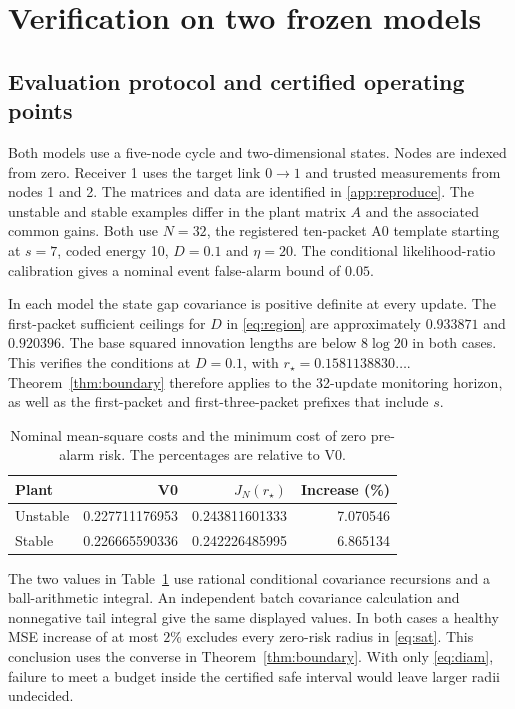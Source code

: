 \section{Verification on two frozen models}
\label{sec:evidence}

\subsection{Evaluation protocol and certified operating points}

Both models use a five-node cycle and two-dimensional states. Nodes are indexed from zero. Receiver 1 uses the target link \(0\to1\) and trusted measurements from nodes 1 and 2. The matrices and data are identified in \ref{app:reproduce}. The unstable and stable examples differ in the plant matrix \(A\) and the associated common gains. Both use \(N=32\), the registered ten-packet A0 template starting at \(s=7\), coded energy 10, \(D=0.1\) and \(\eta=20\). The conditional likelihood-ratio calibration gives a nominal event false-alarm bound of \(0.05\).

In each model the state gap covariance is positive definite at every update. The first-packet sufficient ceilings for \(D\) in \eqref{eq:region} are approximately \(0.933871\) and \(0.920396\). The base squared innovation lengths are below \(8\log 20\) in both cases. This verifies the conditions at \(D=0.1\), with \(r_\star=0.1581138830\ldots\). Theorem~\ref{thm:boundary} therefore applies to the 32-update monitoring horizon, as well as the first-packet and first-three-packet prefixes that include \(s\).

\begin{table}[htbp]
\centering
\caption{Nominal mean-square costs and the minimum cost of zero pre-alarm risk. The percentages are relative to V0.}
\label{tab:critical}
\begin{tabular}{lrrr}
\toprule
Plant & V0 & \(J_N(r_\star)\) & Increase (\%) \\
\midrule
Unstable & 0.227711176953 & 0.243811601333 & 7.070546 \\
Stable   & 0.226665590336 & 0.242226485995 & 6.865134 \\
\bottomrule
\end{tabular}
\end{table}

The two values in Table~\ref{tab:critical} use rational conditional covariance recursions and a ball-arithmetic integral. An independent batch covariance calculation and nonnegative tail integral give the same displayed values. In both cases a healthy MSE increase of at most \(2\%\) excludes every zero-risk radius in \eqref{eq:sat}. This conclusion uses the converse in Theorem~\ref{thm:boundary}. With only \eqref{eq:diam}, failure to meet a budget inside the certified safe interval would leave larger radii undecided.

